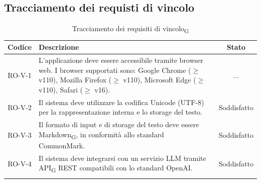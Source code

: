 \documentclass[11pt,a4paper]{article}
\newcommand{\gls}[1]{#1\textsubscript{G}}
\begin{document}
\subsection{Tracciamento dei requisti di vincolo}
\begin{longtable}{|c|p{11cm}|c|}
\hline
\textbf{Codice} & \textbf{Descrizione} & \textbf{Stato}\\
\hline
\endhead
RO-V-1 & L'applicazione deve essere accessibile tramite browser web. 
I browser supportati sono: Google Chrome ($\geq$ v110), Mozilla Firefox 
($\geq$ v110), Microsoft Edge ($\geq$ v110), Safari ($\geq$ v16). & ... \\
\hline
RO-V-2 & Il sistema deve utilizzare la codifica Unicode (UTF-8) per la rappresentazione interna e lo storage del testo. & Soddisfatto \\
\hline
RO-V-3 & Il formato di input e di storage del testo deve essere \gls{Markdown}, in conformità allo standard CommonMark. & Soddisfatto\\
\hline
RO-V-4 & Il sistema deve integrarsi con un servizio LLM tramite \gls{API} REST compatibili con lo standard OpenAI. & Soddisfatto \\
\hline
\addlinespace[1em]
\caption{Tracciamento dei \gls{requisiti di vincolo}}
\label{tab:tracciamento_requisiti_vincolo}
\end{longtable}
\end{document}
